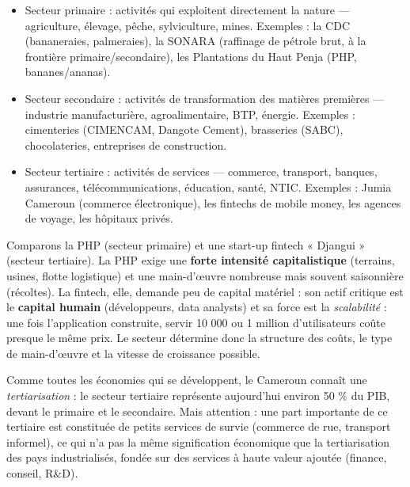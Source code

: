 \documentclass[11pt]{article}
\newcommand{\cle}[1]{{\popxbold\color{popdark}#1}}
\begin{document}
\begin{definition}
\begin{itemize}
\item \cle{Secteur primaire} : activités qui exploitent directement la nature — agriculture, élevage, pêche, sylviculture, mines. Exemples : la CDC (bananeraies, palmeraies), la SONARA (raffinage de pétrole brut, à la frontière primaire/secondaire), les Plantations du Haut Penja (PHP, bananes/ananas).
\item \cle{Secteur secondaire} : activités de transformation des matières premières — industrie manufacturière, agroalimentaire, BTP, énergie. Exemples : cimenteries (CIMENCAM, Dangote Cement), brasseries (SABC), chocolateries, entreprises de construction.
\item \cle{Secteur tertiaire} : activités de services — commerce, transport, banques, assurances, télécommunications, éducation, santé, NTIC. Exemples : Jumia Cameroun (commerce électronique), les fintechs de mobile money, les agences de voyage, les hôpitaux privés.
\end{itemize}
\end{definition}

\begin{exemplebox}
Comparons la PHP (secteur primaire) et une start-up fintech « Djangui » (secteur tertiaire). La PHP exige une \textbf{forte intensité capitalistique} (terrains, usines, flotte logistique) et une main-d'œuvre nombreuse mais souvent saisonnière (récoltes). La fintech, elle, demande peu de capital matériel : son actif critique est le \textbf{capital humain} (développeurs, data analysts) et sa force est la \emph{scalabilité} : une fois l'application construite, servir 10 000 ou 1 million d'utilisateurs coûte presque le même prix. Le secteur détermine donc la structure des coûts, le type de main-d'œuvre et la vitesse de croissance possible.
\end{exemplebox}

\begin{savaistu}
Comme toutes les économies qui se développent, le Cameroun connaît une \emph{tertiarisation} : le secteur tertiaire représente aujourd'hui environ 50 \% du PIB, devant le primaire et le secondaire. Mais attention : une part importante de ce tertiaire est constituée de petits services de survie (commerce de rue, transport informel), ce qui n'a pas la même signification économique que la tertiarisation des pays industrialisés, fondée sur des services à haute valeur ajoutée (finance, conseil, R\&D).
\end{savaistu}
\end{document}
